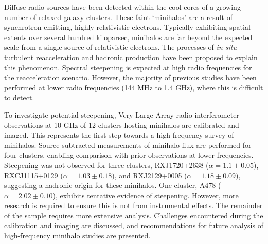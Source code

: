 

%

%




Diffuse radio sources have been detected within the cool cores of a growing number of relaxed galaxy clusters. These faint `minihalos' are a result of synchrotron-emitting, highly relativistic electrons. Typically exhibiting spatial extents over several hundred kiloparsec, minihalos are far beyond the expected scale from a single source of relativistic electrons. The processes of \textit{in situ} turbulent reacceleration and hadronic production have been proposed to explain this phenomenon. Spectral steepening is expected at high radio frequencies for the reacceleration scenario. However, the majority of previous studies have been performed at lower radio frequencies (144 MHz to 1.4 GHz), where this is difficult to detect.

To investigate potential steepening, Very Large Array radio interferometer observations at 10 GHz of 12 clusters hosting minihalos are calibrated and imaged. This represents the first step towards a high-frequency survey of minihalos. Source-subtracted measurements of minihalo flux are performed for four clusters, enabling comparison with prior observations at lower frequencies. Steepening was not observed for three clusters, RXJ1720+2638 ($\alpha=1.1\pm0.05$), RXCJ1115+0129 ($\alpha=1.03\pm0.18$), and RXJ2129+0005 ($\alpha=1.18\pm0.09$), suggesting a hadronic origin for these minihalos. One cluster, A478 ($\alpha=2.02\pm0.10$), exhibits tentative evidence of steepening. However, more research is required to ensure this is not from instrumental effects. The remainder of the sample requires more extensive analysis. Challenges encountered during the calibration and imaging are discussed, and recommendations for future analysis of high-frequency minihalo studies are presented. 

%